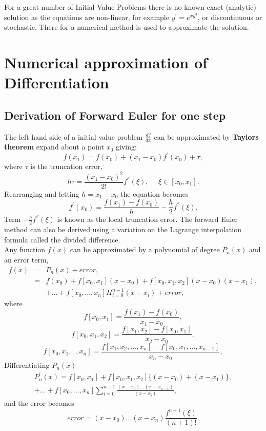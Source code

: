 For a great number of Initial Value Problems there is no known exact (analytic) solution as the equations are non-linear, for example
$y^{'} = e^{xy^4}$, or discontinuous or stochastic. There for a numerical method is used to approximate the solution.  

\section{Numerical approximation of Differentiation}
\subsection{Derivation of Forward Euler for one step}
The left hand side of a initial value problem $\frac{df}{dx}$ can be approximated by  \textbf{Taylors theorem} expand about a point $x_0$ giving:
\begin{equation}f(x_1) = f(x_0)+(x_1-x_0)f^{'}(x_0) + \tau, \end{equation}
where $\tau$ is the truncation error,
\begin{equation}h\tau = \frac{(x_1-x_0)^2}{2!}f^{''}(\xi), \ \ \ \ \ \ \xi \in [x_0,x_1]. \end{equation}
Rearranging and letting $h=x_1-x_0$ the equation becomes
\[f^{'}(x_0)=\frac{f(x_1)-f(x_0)}{h}-\frac{h}{2}f^{''}(\xi). \]
Term $-\frac{h}{2}f^{''}(\xi)$ is known as the local truncation error.
The forward Euler method can also be derived using a variation on the Lagrange interpolation formula
called the divided difference. \\
Any function $f(x)$ can be approximated by a polynomial of degree $P_n(x)$ and an error term,
\begin{eqnarray*}
f(x)&=&P_n(x) + error,\\
&=&f(x_0)+f[x_0,x_1](x-x_0)+f[x_0,x_1,x_2](x-x_0)(x-x_1),\\
& &+...+f[x_0,...,x_n]\Pi_{i=0}^{n-1}(x-x_i)+error,
\end{eqnarray*}
where 
\[f[x_0,x_1] = \frac{f(x_1)-f(x_0)}{x_1-x_0},\]
\[f[x_0,x_1,x_2] = \frac{f[x_1,x_2]-f[x_0,x_1]}{x_2-x_0},\]
\[f[x_0,x_1,..,x_n] = \frac{f[x_1,x_2,...,x_n]-f[x_0,x_1,...,x_{n-1}]}{x_n-x_0},\]
Differentiating $P_n(x)$
\begin{eqnarray*}
P_n^{'}(x)=f[x_0,x_1]+f[x_0,x_1,x_2]\{(x-x_0)+(x-x_1)\}, \\
+...+f[x_0,...,x_n]\sum_{i=0}^{n-1}\frac{(x-x_0)...(x-x_{n-1})}{(x-x_i)},\end{eqnarray*}
and the error becomes
\[
error= (x-x_0)...(x-x_n)\frac{f^{n+1}(\xi)}{(n+1)!}.
\]
